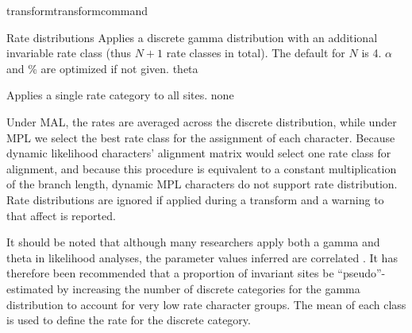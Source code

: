 \begin{command}{transform}{transformcommand}
\begin{arguments}
\begin{argumentgroup}{Rate distributions}
                        {Applies a discrete gamma distribution with an additional
                        invariable rate class (thus $N+1$ rate classes in total).
                        The default for $N$ is 4. $\alpha$ and \% are optimized if
                        not given.}
                        {theta}

                        {Applies a single rate category to all sites.}
                        {none}

                \begin{statement}
                    Under MAL, the rates are averaged across the
                    discrete distribution, while under MPL we select the best
                    rate class for the assignment of each character. Because
                    dynamic likelihood characters' alignment matrix would select
                    one rate class for alignment, and because this procedure is equivalent to a
                    constant multiplication of the branch length, dynamic MPL
                    characters do not support rate distribution. Rate distributions are
                   ignored if applied during a transform and a
                    warning to that affect is reported.
                \end{statement}

                \begin{statement}
                    It should be noted that although many researchers apply both
                    a gamma and theta in likelihood analyses, the parameter
                    values inferred are correlated \cite{sullivan1999}.  It has
                    therefore been recommended that a proportion of invariant
                    sites be ``pseudo''-estimated by increasing the number of
                    discrete categories for the gamma distribution to account
                    for very low rate character groups. The mean of each class
                    is used to define the rate for the discrete category.
                \end{statement}
                
                \end{argumentgroup}

	\end{arguments}
	



\end{command}
